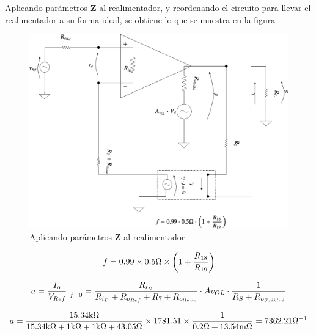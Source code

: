 Aplicando parámetros \textbf{Z} al realimentador, y reordenando el circuito para llevar el realimentador a su forma ideal, se obtiene lo que se muestra en la figura~

\vfill

\clearpage

\begin{figure}[H] %
\begin{center}
\includegraphics[width=0.9 \textwidth, angle=0]{./img/current_loop/CURRENT_LOOP_2.png}
\caption{\label{fig:fig_current_loop_2}\footnotesize{Aplicando parámetros \textbf{Z} al realimentador}}
\end{center}
\end{figure}


\begin{equation}
f = 0.99 \times 0.5 \si[per-mode=symbol]{\ohm} \times \left(  1 + \frac{R_{18}}{R_{19}} \right)
\end{equation}


\begin{equation}
a = \evalat{\frac{I_{o}}{V_{Ref}}}{f=0} = \frac{  R_{i_{D}}  }{  R_{i_{D}} + R_{o_{Ref}} + R_{7} + R_{o_{llave}}  } \cdot A{v_{OL}} \cdot \frac{1}{R_{S} + R_{o_{Sziklai}}} 
\end{equation}

\begin{equation*}
a = \frac{  15.34  \si[per-mode=symbol]{\kilo\ohm}  }{  15.34  \si[per-mode=symbol]{\kilo\ohm} + 1  \si[per-mode=symbol]{\kilo\ohm} + 1  \si[per-mode=symbol]{\kilo\ohm} + 43.05 \si[per-mode=symbol]{\ohm}  } \times 1781.51 \times \frac{1}{ 0.2 \si[per-mode=symbol]{\ohm} + 13.54 \si[per-mode=symbol]{\milli\ohm} } = 7362.21 \si{\per\ohm}
\end{equation*}






